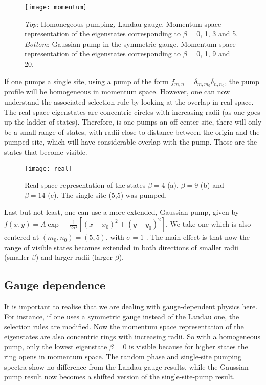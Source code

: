 \documentclass[twocolumn, 10pt, aps, superscriptaddress, floatfix, showpacs, prb, citeautoscript]{revtex4-1}
\newcommand{\co}[2]{#2}
\renewcommand{\paragraph}{\co}
\begin{document}
\begin{figure}[htb]\centering
  \texttt{[image: momentum]}
  \caption{\emph{Top}: Homonegeous pumping, Landau gauge. Momentum
    space representation of the eigenstates corresponding to
    $\beta=0$, 1, 3 and 5.  
    \emph{Bottom}: Gaussian pump in the
    symmetric gauge. Momentum space representation of the eigenstates
    corresponding to $\beta=0$, 1, 9 and 20.}
  \label{fig:hom_mom_sp}
\end{figure}



\paragraph{$\delta$-like pump}
If one pumps a single site, using a pump of the form $f_{m,n} =
\delta_{m,m_0} \delta_{n,n_0}$, the pump profile will be homogeneous
in momentum space.  However, one can now understand the associated
selection rule by looking at the overlap in real-space. The real-space
eigenstates are concentric circles with increasing radii (as one goes
up the ladder of states). Therefore, is one pumps an off-center site,
there will only be a small range of states, with radii close to
distance between the origin and the pumped site, which will have
considerable overlap with the pump. Those are the states that become
visible.

\begin{figure}[htb]
  \centerline{\texttt{[image: real]}}
  \caption{Real space representation of the states $\beta=4$ (a), $\beta=9$ (b) and $\beta=14$ (c). The single site (5,5) was pumped.}
  \label{fig:delta_real_sp}
\end{figure}


\paragraph{Gaussian pump}
Last but not least, one can use a more extended, Gaussian pump, given
by \(f(x,y) = A \exp- \frac{1}{2\sigma^2} \left[(x-x_0)^2 + (y-y_0)^2
\right]\). We take one which is also centered at \((m_0,n_0) = (5,5)\),
with \(\sigma =1\) . The main effect is that now the range of visible
states becomes extended in both directions of smaller radii (smaller
\(\beta\)) and larger radii (larger \(\beta\)).

\subsection{Gauge dependence}
\label{sec:gauge}
It is important to realise that we are dealing with gauge-dependent
physics here. For instance, if one uses a symmetric gauge instead of
the Landau one, the selection rules are modified. Now the momentum
space representation of the eigenstates are also concentric rings with
increasing radii. So with a homogeneous pump, only the lowest
eigenstate $\beta=0$ is visible because for higher states the ring
opens in momentum space. The random phase and single-site pumping
spectra show no difference from the Landau gauge results, while the
Gaussian pump result now becomes a shifted version of the
single-site-pump result.
\end{document}
